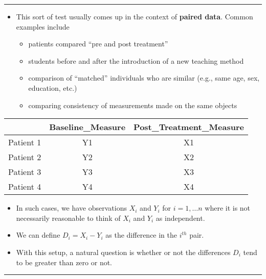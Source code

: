 \documentclass[]{book}
\providecommand{\tightlist}{%
  \setlength{\itemsep}{0pt}\setlength{\parskip}{0pt}}
\begin{document}
\begin{center}\rule{0.5\linewidth}{\linethickness}\end{center}

\begin{itemize}
\tightlist
\item
  This sort of test usually comes up in the context of \textbf{paired data}.
  Common examples include

  \begin{itemize}
  \tightlist
  \item
    patients compared ``pre and post treatment''
  \item
    students before and after the introduction of a new teaching method
  \item
    comparison of ``matched'' individuals who are similar (e.g., same age, sex, education, etc.)
  \item
    comparing consistency of measurements made on the same objects
  \end{itemize}
\end{itemize}

\begin{table}[ht]
\centering
\begin{tabular}{ccc}
  \hline
 & Baseline\_Measure & Post\_Treatment\_Measure \\ 
  \hline
Patient 1 & Y1 & X1 \\ 
  Patient 2 & Y2 & X2 \\ 
  Patient 3 & Y3 & X3 \\ 
  Patient 4 & Y4 & X4 \\ 
   \hline
\end{tabular}
\end{table}

\begin{itemize}
\item
  In such cases, we have observations \(X_{i}\) and \(Y_{i}\) for \(i = 1,\ldots n\) where
  it is not necessarily reasonable to think of \(X_{i}\) and \(Y_{i}\) as independent.
\item
  We can define \(D_{i} = X_{i} - Y_{i}\) as the difference in the \(i^{th}\) pair.
\item
  With this setup, a natural question is whether or not the differences \(D_{i}\) tend to be
  greater than zero or not.
\end{itemize}

\begin{center}\rule{0.5\linewidth}{\linethickness}\end{center}
\end{document}
